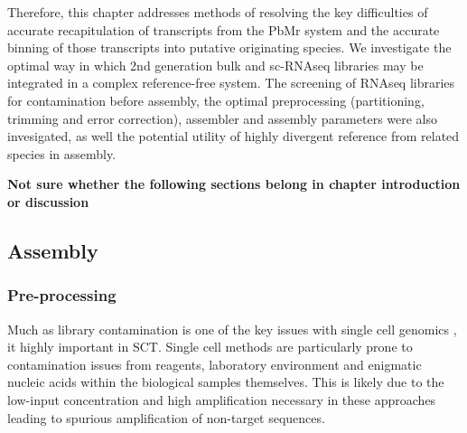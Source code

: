 


Therefore, this chapter addresses methods of resolving the key difficulties of accurate recapitulation of 
transcripts from the PbMr system and the accurate binning of those transcripts into putative originating
species.  We investigate the optimal way in which 2nd generation bulk and sc-RNAseq libraries
may be integrated in a complex reference-free system.  The screening of RNAseq libraries for contamination
before assembly, the optimal preprocessing (partitioning, trimming and error correction), assembler and assembly
parameters were also invesigated, as well the potential utility of highly divergent reference from related species
in assembly.


\textbf{Not sure whether the following sections belong in chapter introduction or discussion}
\subsection{Assembly}

\subsubsection{Pre-processing}
Much as library contamination is one of the key issues with single cell genomics \citep{Blainey2013,Lusk2014}, it highly
important in SCT.  Single cell methods are particularly prone to contamination issues
from reagents, laboratory environment and enigmatic nucleic acids within the biological samples themselves.
This is likely due to the low-input concentration and high amplification necessary in these approaches \citep{Blainey2013} leading
to spurious amplification of non-target sequences. 

